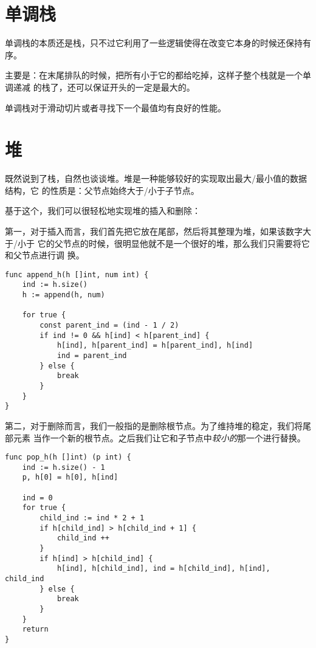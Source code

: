 \section{单调栈}

单调栈的本质还是栈，只不过它利用了一些逻辑使得在改变它本身的时候还保持有序。

主要是：在末尾排队的时候，把所有小于它的都给吃掉，这样子整个栈就是一个单调递减
的栈了，还可以保证开头的一定是最大的。

单调栈对于滑动切片或者寻找下一个最值均有良好的性能。


\section{堆}

既然说到了栈，自然也谈谈堆。堆是一种能够较好的实现取出最大/最小值的数据结构，它
的性质是：父节点始终大于/小于子节点。

基于这个，我们可以很轻松地实现堆的插入和删除：

第一，对于插入而言，我们首先把它放在尾部，然后将其整理为堆，如果该数字大于/小于
它的父节点的时候，很明显他就不是一个很好的堆，那么我们只需要将它和父节点进行调
换。
\begin{lstlisting}
func append_h(h []int, num int) {
    ind := h.size()
    h := append(h, num)
    
    for true {
        const parent_ind = (ind - 1 / 2)
        if ind != 0 && h[ind] < h[parent_ind] {
            h[ind], h[parent_ind] = h[parent_ind], h[ind]
            ind = parent_ind
        } else {
            break
        }
    }
}
\end{lstlisting}

第二，对于删除而言，我们一般指的是删除根节点。为了维持堆的稳定，我们将尾部元素
当作一个新的根节点。之后我们让它和子节点中\emph{较小的}那一个进行替换。
\begin{lstlisting}
func pop_h(h []int) (p int) {
    ind := h.size() - 1
    p, h[0] = h[0], h[ind]

    ind = 0
    for true {
        child_ind := ind * 2 + 1
        if h[child_ind] > h[child_ind + 1] {
            child_ind ++
        }
        if h[ind] > h[child_ind] {
            h[ind], h[child_ind], ind = h[child_ind], h[ind], child_ind
        } else {
            break
        }
    }
    return
}
\end{lstlisting}


